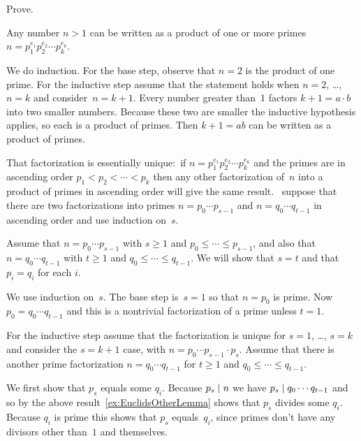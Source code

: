 \documentclass{test}  %
\begin{document}
\begin{problem}   
Prove.
\begin{exes}
\begin{exercise} 
  Any number $n>1$ can be written as a product of one or more primes
  $n=p_1^{e_1}p_2^{e_2}\cdots p_k^{e_k}$.
\end{exercise}
\begin{answer}
  We do induction.
  For the base step, observe that $n=2$ is the product of one prime. 
  For the inductive step assume that the statement holds when $n=2$, \ldots, 
  $n=k$ and consider~$n=k+1$.
  Every number greater than~$1$ factors $k+1=a\cdot b$ into two smaller
  numbers.
  Because these two are smaller
  the inductive hypothesis applies, so each is a product of 
  primes.
  Then $k+1=ab$ can be written as a product of primes.  
\end{answer}
\begin{exercise} 
  That factorization is essentially unique:~if 
  $n=p_1^{e_1}p_2^{e_2}\cdots p_k^{e_k}$ and the primes
  are in ascending order $p_1<p_2<\cdots<p_k$ then any other
  factorization of~$n$ into a product of primes in ascending order will give the
  same result. 
  \hint~suppose that there are two factorizations into primes 
   $n=p_0\cdots p_{s-1}$ and $n=q_0\cdots q_{t-1}$ in ascending order 
   and use induction on~$s$.
\end{exercise}
\begin{answer}
  Assume that $n=p_0\cdots p_{s-1}$ with $s\geq 1$ and
  $p_0\leq\cdots \leq p_{s-1}$, 
  and also that $n=q_0\cdots q_{t-1}$ with $t\geq 1$ 
  and $q_0\leq\cdots \leq q_{t-1}$.
  We will show that $s=t$ and that $p_i=q_i$ for each $i$.

  We use induction on~$s$.
  The base step is~$s=1$ so that $n=p_0$ is prime.
  Now $p_0=q_0\cdots q_{t-1}$ and this is a nontrivial factorization of a prime
  unless $t=1$.

  For the inductive step assume that the factorization is unique for
  $s=1$, \ldots, $s=k$ and consider the $s=k+1$ case, with
  $n=p_0\cdots p_{s-1}\cdot p_s$.   
  Assume that there is another prime factorization $n=q_0\cdots q_{t-1}$
  for $t\geq 1$ and $q_0\leq\cdots \leq q_{t-1}$.

  We first show that $p_s$ equals some $q_i$.
  Because $p_s\mid n$ we have $p_s\mid q_0\cdots q_{t-1}$ and so
  by the above result~\ref{ex:EuclidsOtherLemma} shows that
  $p_s$ divides some $q_i$.
  Because $q_i$ is prime this shows that $p_s$ equals~$q_i$,
  since primes don't have any divisors other than~$1$ and themselves.


\end{answer}
\end{exes}
\end{problem}
\end{document}
